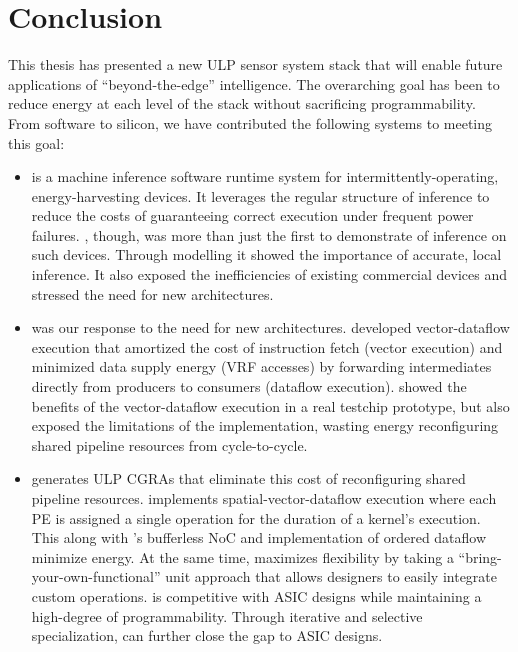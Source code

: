 \chapter{Conclusion}
\label{chapter:conclusion}
This thesis has presented a new ULP sensor system stack that will enable future applications of ``beyond-the-edge'' intelligence.
%
The overarching goal has been to reduce energy at each level of the stack without sacrificing programmability.
%
From software to silicon, we have contributed the following systems to meeting this goal:
%

\begin{itemize}

\item \sonic is a machine inference software runtime system for intermittently-operating, energy-harvesting devices.
% 
It leverages the regular structure of inference to reduce the costs of guaranteeing correct execution under frequent power failures.
% 
\sonic, though, was more than just the first to demonstrate of inference on such devices.
% 
Through modelling it showed the importance of accurate, local inference.
% 
It also exposed the inefficiencies of existing commercial devices and stressed the need for new architectures.

\item \manic was our response to the need for new architectures.
% 
\manic developed vector-dataflow execution that amortized the cost of instruction fetch (vector execution) and minimized data supply energy (VRF accesses) by forwarding intermediates directly from producers to consumers (dataflow execution).
% 
\msilicon showed the benefits of the vector-dataflow execution in a real testchip prototype, but also exposed the limitations of the implementation, wasting energy reconfiguring shared pipeline resources from cycle-to-cycle.

\item \snafu generates ULP CGRAs that eliminate this cost of reconfiguring shared pipeline resources.
% 
\snafu implements spatial-vector-dataflow execution where each PE is assigned a single operation for the duration of a kernel's execution.
% 
This along with \snafu's bufferless NoC and implementation of ordered dataflow minimize energy.
% 
At the same time, \snafu maximizes flexibility by taking a ``bring-your-own-functional'' unit approach that allows designers to easily integrate custom operations.
% 
\snafu is competitive with ASIC designs while maintaining a high-degree of programmability.
% 
Through iterative and selective specialization, \snafu can further close the gap to ASIC designs.


\end{itemize}
